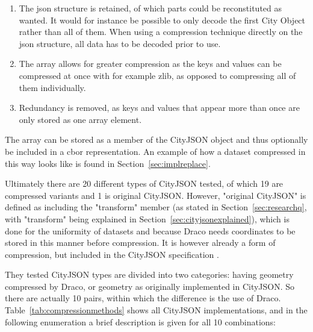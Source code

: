 \begin{enumerate}
\item The \ac{json} structure is retained, of which parts could be reconstituted as wanted. It would for instance be possible to only decode the first City Object rather than all of them. When using a compression technique directly on the \ac{json} structure, all data has to be decoded prior to use.
\item The array allows for greater compression as the keys and values can be compressed at once with for example zlib, as opposed to compressing all of them individually.
\item Redundancy is removed, as keys and values that appear more than once are only stored as one array element.
\end{enumerate}
The array can be stored as a member of the CityJSON object and thus optionally be included in a \ac{cbor} representation.
An example of how a dataset compressed in this way looks like is found in Section~\ref{sec:implreplace}.


Ultimately there are 20 different types of CityJSON tested, of which 19 are compressed variants and 1 is original CityJSON.
However, "original CityJSON" is defined as including the "transform" member (as stated in Section~\ref{sec:researchq}, with "transform" being explained in Section~\ref{sec:cityjsonexplained}), which is done for the uniformity of datasets and because Draco needs coordinates to be stored in this manner before compression.
It is however already a form of compression, but included in the CityJSON specification \citep{cityjsonspecs}.



They tested CityJSON types are divided into two categories: having geometry compressed by Draco, or geometry as originally implemented in CityJSON.
So there are actually 10 pairs, within which the difference is the use of Draco.
Table~\ref{tab:compressionmethods} shows all CityJSON implementations, and in the following enumeration a brief description is given for all 10 combinations:

